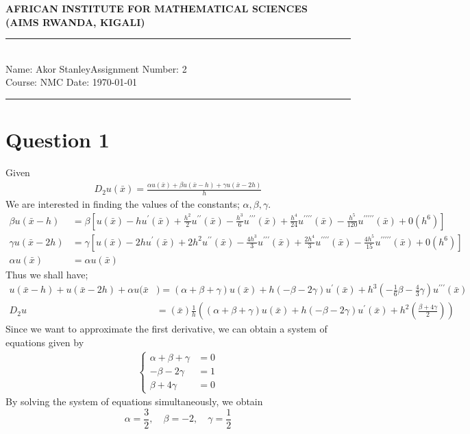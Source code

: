 \documentclass[12pt,a4paper]{article}
\newcommand{\student}{Akor Stanley}
\newcommand{\course}{NMC }
\newcommand{\assignment}{2}
\begin{document}
\thispagestyle{empty}
\begin{center}
\textbf{AFRICAN INSTITUTE FOR MATHEMATICAL SCIENCES \\[0.5cm]
(AIMS RWANDA, KIGALI)}
\vspace{1.0cm}
\end{center}
\noindent
\rule{17cm}{0.2cm}\\[0.3cm]
Name: \student \hfill Assignment Number: \assignment\\[0.1cm]
Course: \course \hfill Date: \today\\
\rule{17cm}{0.05cm}
\vspace{1.0cm}
\section*{Question 1}
Given
\begin{align*}
D_{2}u(\bar{x})=\frac{\alpha u(\bar{x})+\beta u(\bar{x}-h)+\gamma u(\bar{x}-2h)}{h}
\end{align*}
We are interested in finding the values of the constants; $\alpha,\beta,\gamma$.
\begin{align*}
\beta u(\bar{x}-h)&=\beta\left[u(\bar{x})-hu^{\prime}(\bar{x})+\frac{h^{2}}{2}u^{\prime \prime}(\bar{x})-\frac{h^{3}}{6}u^{\prime \prime \prime}(\bar{x})+\frac{h^{4}}{24}u^{\prime \prime \prime \prime}(\bar{x})-\frac{h^{5}}{120}u^{\prime \prime \prime \prime \prime}(\bar{x}) + 0(h^{6})\right]\\
\gamma u(\bar{x}-2h)&=\gamma\left[u(\bar{x})-2hu^{\prime}(\bar{x})+2h^{2}u^{\prime \prime}(\bar{x})-\frac{4h^{3}}{3}u^{\prime \prime \prime}(\bar{x})+ \frac{2h^{4}}{3}u^{\prime \prime \prime \prime}(\bar{x}) -\frac{4h^{5}}{15}u^{\prime \prime \prime \prime \prime}(\bar{x}) + 0(h^{6})\right]\\
\alpha u(\bar{x})&=\alpha u(\bar{x})
\end{align*}
Thus we shall have;
\begin{align*}
u(\bar{x}-h)+ u(\bar{x}-2h)+\alpha u(\bar{x}&)=(\alpha+\beta+\gamma)u(\bar{x})+h(-\beta -2\gamma)u^{\prime}(\bar{x})+h^{3}(-\frac{1}{6}\beta-\frac{4}{3}\gamma)u^{\prime \prime \prime}(\bar{x})\\
D_{2}u&=(\bar{x})\frac{1}{h}\left((\alpha+\beta+\gamma)u(\bar{x})+h(-\beta -2\gamma)u^{\prime}(\bar{x})+h^{2}\left(\frac{\beta +4\gamma }{2}\right)\right)
\end{align*}
Since we want to approximate the first derivative, we can obtain a system of equations given by
\begin{align*}
\begin{cases}
\alpha+\beta+\gamma&=0\\
-\beta -2\gamma&=1\\
\beta +4\gamma&=0
\end{cases}
\end{align*}
By solving the system of equations simultaneously, we obtain
$$\alpha=\frac{3}{2}, \quad \beta=-2, \quad \gamma=\frac{1}{2}$$
\end{document}
